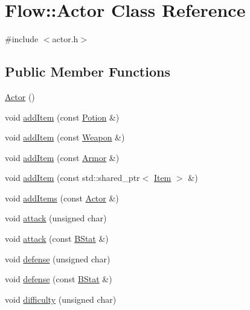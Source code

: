 \hypertarget{class_flow_1_1_actor}{}\section{Flow\+:\+:Actor Class Reference}
\label{class_flow_1_1_actor}


{\ttfamily \#include $<$actor.\+h$>$}

\subsection*{Public Member Functions}
\begin{DoxyCompactItemize}
\item 
\hyperlink{class_flow_1_1_actor_a242b634b62029fb8fc3226e6dae85606}{Actor} ()
\item 
void \hyperlink{class_flow_1_1_actor_a6ea333bb237a2c0cf932048003b4a4cd}{add\+Item} (const \hyperlink{class_flow_1_1_potion}{Potion} \&)
\item 
void \hyperlink{class_flow_1_1_actor_a330ec5658330568c65799ccd34e77889}{add\+Item} (const \hyperlink{class_flow_1_1_weapon}{Weapon} \&)
\item 
void \hyperlink{class_flow_1_1_actor_ae27354156a8ea17e3141c087996e6d79}{add\+Item} (const \hyperlink{class_flow_1_1_armor}{Armor} \&)
\item 
void \hyperlink{class_flow_1_1_actor_a0c00bc33f98a815227a665fb4d61664d}{add\+Item} (const std\+::shared\+\_\+ptr$<$ \hyperlink{class_flow_1_1_item}{Item} $>$ \&)
\item 
void \hyperlink{class_flow_1_1_actor_abf713d204f2cf3fc2de46b32c775ebdc}{add\+Items} (const \hyperlink{class_flow_1_1_actor}{Actor} \&)
\item 
void \hyperlink{class_flow_1_1_actor_a7c829abc5329c2506ea0ffe5b029c1a9}{attack} (unsigned char)
\item 
void \hyperlink{class_flow_1_1_actor_a7aee4043e372b4e1391418daa5728958}{attack} (const \hyperlink{class_flow_1_1_b_stat}{B\+Stat} \&)
\item 
void \hyperlink{class_flow_1_1_actor_a20e4a2e21e5ba583df61b83770a35033}{defense} (unsigned char)
\item 
void \hyperlink{class_flow_1_1_actor_aba8a18fe7673cbd965d195e128067351}{defense} (const \hyperlink{class_flow_1_1_b_stat}{B\+Stat} \&)
\item 
void \hyperlink{class_flow_1_1_actor_aec7a9e3499e6d4441d3f32c4437b3d83}{difficulty} (unsigned char)
\item 

\end{DoxyCompactItemize}
